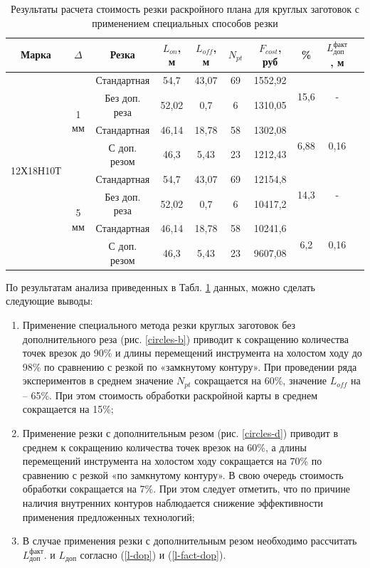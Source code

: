 \documentclass[12pt,twoside]{report}
\begin{document}
\begin{table}
  \caption{Результаты расчета стоимость резки раскройного плана для круглых заготовок с применением специальных способов резки}
  \label{circles}
  \begin{tabular}{cccccccccc}
    \hline
    Марка & $\Delta$ & Резка & $L_{on}$, м & $L_{off}$, м & $N_{pt}$ & $F_{cost}$, руб & \% & $L_\text{доп}^\text{факт}$, м \\
    \hline
    \multirow{8}{*}{12Х18Н10Т} & \multirow{4}{*}{1 мм} & Стандартная & 54,7 &	43,07	& 69 & 1552,92 & \multirow{2}{*}{15,6} &	\multirow{2}{*}{-} \\
    & & Без доп. реза & 52,02 &	0,7 & 6 & 1310,05 \\
    & & Стандартная   & 46,14 & 18,78 & 58 & 1302,08 & \multirow{2}{*}{6,88} & \multirow{2}{*}{0,16} \\
    & & С доп. резом  & 46,3  & 5,43  & 23 & 1212,43 \\
    & \multirow{4}{*}{5 мм} & Стандартная & 54,7 &	43,07	& 69 & 12154,8 & \multirow{2}{*}{14,3} &	\multirow{2}{*}{-} \\
    & & Без доп. реза & 52,02 &	0,7 & 6 & 10417,2 \\
    & & Стандартная   & 46,14 & 18,78 & 58 & 10241,6 & \multirow{2}{*}{6,2} & \multirow{2}{*}{0,16} \\
    & & С доп. резом  & 46,3  & 5,43  & 23 & 9607,08 \\
  \end{tabular}
\end{table}

По результатам анализа приведенных в Табл. \ref{circles}
данных, можно сделать следующие выводы:

\begin{enumerate}
\item Применение специального метода резки круглых заготовок
без дополнительного реза (рис. \ref{circles-b})
приводит к сокращению количества точек врезок до 90\%
 и длины перемещений инструмента на холостом ходу до 98\%
 по сравнению с резкой по «замкнутому контуру».
 При проведении ряда экспериментов в среднем значение $N_{pt}$
 сокращается на 60\%, значение $L_{off}$ на – 65\%.
 При этом стоимость обработки раскройной карты в среднем сокращается на 15\%;

\item Применение резки с дополнительным резом (рис. \ref{circles-d})
приводит в среднем к сокращению количества точек врезок на 60\%,
а длины перемещений инструмента на холостом ходу сокращается на 70\%
по сравнению с резкой «по замкнутому контуру».
В свою очередь стоимость обработки сокращается на 7\%.
При этом следует отметить,
что по причине наличия внутренних контуров
наблюдается снижение эффективности применения
предложенных технологий;

\item В случае применения резки с дополнительным резом необходимо рассчитать
$L_\text{доп}^\text{факт}$.
и
$L_\text{доп}$
согласно (\ref{l-dop}) и (\ref{l-fact-dop}).
\end{enumerate}
\end{document}

